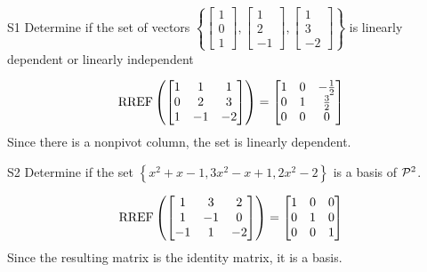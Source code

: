 \documentclass{sbgLAexam}
\begin{document}
\begin{extract}\newpage\end{extract}
\begin{problem}{S1}
Determine if the set of vectors  $\left\{\begin{bmatrix} 1 \\ 0 \\ 1 \end{bmatrix}, \begin{bmatrix} 1 \\ 2 \\ -1 \end{bmatrix}, \begin{bmatrix} 1 \\ 3 \\ -2 \end{bmatrix}\right\}$ is  linearly dependent or linearly independent
\end{problem}
\begin{solution}
$$\RREF\left( \begin{bmatrix} 1 &  1 & 1 \\ 0  & 2 & 3 \\ 1  & -1 & -2 \end{bmatrix} \right) = \begin{bmatrix} 1 &  0 & -\frac{1}{2} \\ 0  & 1 & \frac{3}{2} \\ 0& 0 & 0  \end{bmatrix}$$
Since there is a nonpivot column, the set is linearly dependent.
\end{solution}

\begin{problem}{S2}
Determine if the set $\left\{ x^2+x-1, 3x^2-x+1, 2x^2-2 \right\}$ is a basis of $\P^2$.
\end{problem}
\begin{solution}
$$\RREF\left(\begin{bmatrix} 1 & 3 & 2 \\ 1 & -1 & 0 \\ -1 & 1 & -2 \end{bmatrix} \right)= \begin{bmatrix} 1 & 0 &0 \\ 0 & 1 & 0 \\ 0 & 0 & 1\end{bmatrix}$$
Since the resulting matrix is the identity matrix, it is a basis.
\end{solution}
\end{document}
